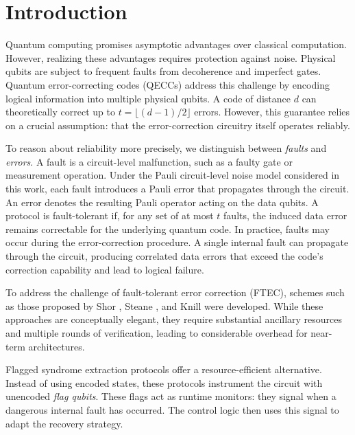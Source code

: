\documentclass[acmsmallw,review]{acmart}
\newcommand{\bw}[1]{}
\begin{document}


\maketitle

\bw{change ST solver}
\section{Introduction}

Quantum computing promises asymptotic advantages over classical computation. However, realizing these advantages requires protection against noise. Physical qubits are subject to frequent faults from decoherence and imperfect gates. 
Quantum error-correcting codes (QECCs) address this challenge by encoding logical information into multiple physical qubits. A code of distance $d$ can theoretically correct up to $t = \lfloor (d-1)/2 \rfloor$ errors. However, this guarantee relies on a crucial assumption: that the error-correction circuitry itself operates reliably.

To reason about reliability more precisely, we distinguish between \emph{faults} and \emph{errors}.
A fault is a circuit-level malfunction, such as a faulty gate or measurement operation. Under the Pauli circuit-level noise model considered in this work, each fault introduces a Pauli error that propagates through the circuit. An error denotes the resulting Pauli operator acting on the data qubits. A protocol is fault-tolerant if, for any set of at most 
$t$ faults, the induced data error remains correctable for the underlying quantum code.
In practice, faults may occur during the error-correction procedure. A single internal fault can propagate through the circuit, producing correlated data errors that exceed the code's correction capability and lead to logical failure.

To address the challenge of fault-tolerant error correction (FTEC), schemes such as those proposed by Shor \cite{Shor96}, Steane \cite{Steane97}, and Knill \cite{Knill05} were developed. While these approaches are conceptually elegant, they require substantial ancillary resources and multiple rounds of verification, leading to considerable overhead for near-term architectures. 

Flagged syndrome extraction protocols offer a resource-efficient alternative. Instead of using encoded states, these protocols instrument the circuit with unencoded \emph{flag qubits}. These flags act as runtime monitors: they signal when a dangerous internal fault has occurred. The control logic then uses this signal to adapt the recovery strategy.
\end{document}
